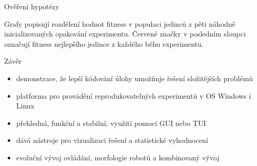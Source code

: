 \documentclass[portrait,a0paper,fontscale=0.25]{baposter}
\begin{document}
\begin{poster}
\begin{posterbox}[column=1, name=result1]{Ověření hypotézy}
\begin{center}
\end{center}
\footnotesize{Grafy popisují rozdělení hodnot fitness v populaci jedinců z pěti
náhodně inicializovaných opakování experimentu. Červené značky v posledním
sloupci označují fitness nejlepšího jedince z každého běhu experimentu.}

\end{posterbox}

\begin{posterbox}[column=1, name=conclusion, below=result1, bottomaligned=newsomething2]{Závěr}

\begin{itemize}[leftmargin=*]
    \item demonstrace, že lepší kódování úlohy umožňuje řešení složitějších
        problémů
    \item platforma pro provádění reprodukovatelných experimentů v OS Windows i
        Linux
    \item přehledná, funkční a stabilní; využití pomocí GUI nebo TUI
    \item dává nástroje pro vizualizaci řešení a statistické vyhodnocení
    \item evoluční vývoj ovládání, morfologie robotů a kombinovaný vývoj
\end{itemize}

\begin{center}
    

\end{center}
\end{posterbox}
\end{poster}
\end{document}
